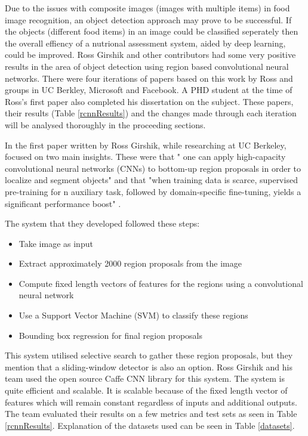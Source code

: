 Due to the issues with composite images (images with multiple items) in food image recognition, an object detection approach may prove to be successful.
If the objects (different food items) in an image could be classified seperately then the overall effiency of a nutrional assessment system, aided by deep learning, could be improved.
Ross Girshik and other contributors had some very positive results in the area
of object detection using region based convolutional neural networks. There were
four iterations of papers based on this work by Ross and groups in UC Berkley,
Microsoft and Facebook. A PHD student at the time of Ross's first paper also
completed his dissertation on the subject. These papers, their
results (Table \ref{rcnnResults}) and the changes made through each iteration will be analysed thoroughly in the proceeding sections.

In the first paper written by Ross Girshik, while researching at UC Berkeley,
focused on two main insights. These were that " one can apply high-capacity convolutional neural networks (CNNs) to bottom-up region proposals in order to localize and segment objects" and that
"when training data is scarce, supervised pre-training for n auxiliary task,
followed by domain-specific fine-tuning, yields a significant performance boost"
\parencite{rcnn}.

The system that they developed followed these steps:
\begin{itemize}
    \item{Take image as input}
    \item{Extract approximately 2000 region proposals from the image}
    \item{Compute fixed length vectors of features for the regions using a convolutional
        neural network}
    \item{Use a Support Vector Machine (SVM) to classify these regions}
    \item{Bounding box regression for final region proposals}
\end{itemize}

This system utilised selective search to gather these region proposals, but they
mention that a sliding-window detector is also an option. Ross Girshik and his
team used the open source Caffe CNN library for this system. The system is quite
efficient and scalable. It is scalable because of the fixed length vector of
features which will remain constant regardless of inputs and additional outputs.
The team evaluated their results on a few metrics and test sets as seen in Table
\ref{rcnnResults}. Explanation of the datasets used can be seen in Table \ref{datasets}.

